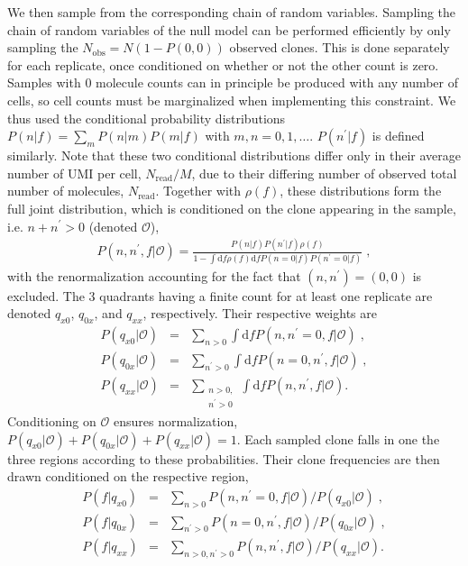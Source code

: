 \documentclass[pre,twocolumn,english,longbibliography]{revtex4}
\newcommand{\<}{\langle}
\renewcommand{\>}{\rangle}
\begin{document}
We then sample from the corresponding chain of random variables.
Sampling the chain of random variables of the null model can be performed efficiently by only sampling the $N_{\textrm{obs}}=N(1-P(0,0))$ observed clones. This is done separately for each replicate, once conditioned on whether or not the other count is zero. 
Samples with 0 molecule counts can in principle be produced with any number of cells, so cell counts must be marginalized when implementing this constraint. We thus used the conditional probability distributions $P(n|f)=\sum_{m}P(n|m)P(m|f)$ with $m,n=0,1,\dots$. $P(n^\prime|f)$ is defined similarly. Note that these two conditional distributions differ only in their average number of UMI per cell, $N_{\textrm{read}}/M$, due to their differing number of observed total number of molecules, $N_{\textrm{read}}$. Together with $\rho(f)$, these distributions form the full joint distribution, which is conditioned on the clone appearing in the sample, i.e. $n+n^{\prime}>0$ (denoted $\mathcal{O}$), 
\begin{align}
	P(n,n^{\prime},f|\mathcal{O})= \frac{P(n|f)P(n^{\prime}|f)\rho(f)}{1-\int{\textrm{d}f \rho(f)\textrm{d}f P(n=0|f)P(n^{\prime}=0|f)}}\;,  
\end{align}
with the renormalization accounting for the fact that $(n,n^{\prime})=(0,0)$ is excluded. The 3 quadrants having a finite count for at least one replicate are denoted $q_{x0}$, $q_{0x}$, and $q_{xx}$, respectively. Their respective weights are
\begin{align}
	P(q_{x0}|\mathcal{O})&=&\sum_{n>0}\int{\textrm{d}f P(n,n^{\prime}=0,f|\mathcal{O})}\;,\\
	P(q_{0x}|\mathcal{O})&=&\sum_{n^{\prime}>0}\int{\textrm{d}f P(n=0,n^{\prime},f|\mathcal{O})}\;,\\
	P(q_{xx}|\mathcal{O})&=&\sum_{\substack{n>0,\\n^{\prime}>0}}\int{\textrm{d}f P(n,n^{\prime},f|\mathcal{O})}.
\end{align}
Conditioning on $\mathcal{O}$ ensures normalization, $P(q_{x0}|\mathcal{O})+P(q_{0x}|\mathcal{O})+P(q_{xx}|\mathcal{O})=1$. Each sampled clone falls in one the three regions according to these probabilities. Their clone frequencies are then drawn conditioned on the respective region, 
\begin{align}
	P(f|q_{x0})&=&\sum_{n>0}P(n,n^{\prime}=0,f|\mathcal{O})/P(q_{x0}|\mathcal{O})\;,\\
	P(f|q_{0x})&=&\sum_{n^{\prime}>0}P(n=0,n^{\prime},f|\mathcal{O})/P(q_{0x}|\mathcal{O})\;,\\
	P(f|q_{xx})&=&\sum_{{n>0,n^{\prime}>0}}P(n,n^{\prime},f|\mathcal{O})/P(q_{xx}|\mathcal{O}).
\end{align}
\end{document}
